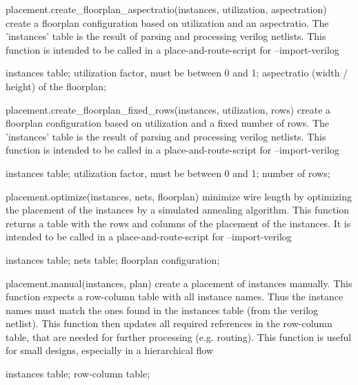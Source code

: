 \begin{APIfunc}{placement.create\_floorplan\_aspectratio(instances, utilization, aspectration)}
    create a floorplan configuration based on utilization and an aspectratio. The 'instances' table is the result of parsing and processing verilog netlists. This function is intended to be called in a place-and-route-script for --import-verilog
    \begin{APIparameters}
            instances table;
            utilization factor, must be between 0 and 1;
            aspectratio (width / height) of the floorplan;
    \end{APIparameters}
\end{APIfunc}
\begin{APIfunc}{placement.create\_floorplan\_fixed\_rows(instances, utilization, rows)}
    create a floorplan configuration based on utilization and a fixed number of rows. The 'instances' table is the result of parsing and processing verilog netlists. This function is intended to be called in a place-and-route-script for --import-verilog
    \begin{APIparameters}
            instances table;
            utilization factor, must be between 0 and 1;
            number of rows;
    \end{APIparameters}
\end{APIfunc}
\begin{APIfunc}{placement.optimize(instances, nets, floorplan)}
    minimize wire length by optimizing the placement of the instances by a simulated annealing algorithm. This function returns a table with the rows and columns of the placement of the instances. It is intended to be called in a place-and-route-script for --import-verilog
    \begin{APIparameters}
            instances table;
            nets table;
            floorplan configuration;
    \end{APIparameters}
\end{APIfunc}
\begin{APIfunc}{placement.manual(instances, plan)}
    create a placement of instances manually. This function expects a row-column table with all instance names. Thus the instance names must match the ones found in the instances table (from the verilog netlist). This function then updates all required references in the row-column table, that are needed for further processing (e.g. routing). This function is useful for small designs, especially in a hierarchical flow
    \begin{APIparameters}
            instances table;
            row-column table;
    \end{APIparameters}
\end{APIfunc}
